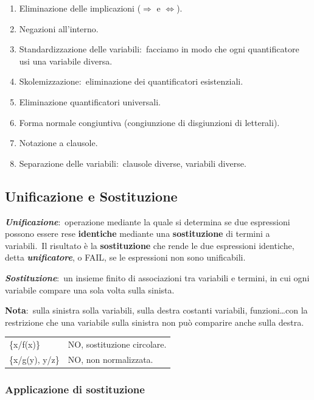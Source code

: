 \begin{enumerate}
	\item Eliminazione delle implicazioni ($\Rightarrow$ e $\Leftrightarrow$).
	\item Negazioni all'interno.
	\item Standardizzazione delle variabili:\ facciamo in modo che ogni quantificatore usi una variabile diversa.
	\item Skolemizzazione:\ eliminazione dei quantificatori esistenziali.
	\item Eliminazione quantificatori universali.
	\item Forma normale congiuntiva (congiunzione di disgiunzioni di letterali).
	\item Notazione a clausole.
	\item Separazione delle variabili:\ clausole diverse, variabili diverse.
\end{enumerate}

\subsection{Unificazione e Sostituzione}

\textbf{\textit{Unificazione}}:\ operazione mediante la quale si determina se due espressioni possono essere rese \textbf{identiche} mediante una \textbf{sostituzione} di termini a variabili.\
Il risultato è la \textbf{sostituzione} che rende le due espressioni identiche, detta \textbf{\textit{unificatore}}, o FAIL, se le espressioni non sono unificabili.

\noindent\textbf{\textit{Sostituzione}}:\ un insieme finito di associazioni tra variabili e termini, in cui ogni variabile compare una sola volta sulla sinista.\

\textbf{Nota}:\ sulla sinistra solla variabili, sulla destra costanti variabili, funzioni\dots con la restrizione che una variabile sulla sinistra non può comparire anche sulla destra.

\begin{table}[H]
	\centering
	\begin{tabular}{l l}
		\{x/f(x)\}      & NO, sostituzione circolare. \\
		\{x/g(y), y/z\} & NO, non normalizzata.       \\
	\end{tabular}
\end{table}

\subsubsection{Applicazione di sostituzione}

